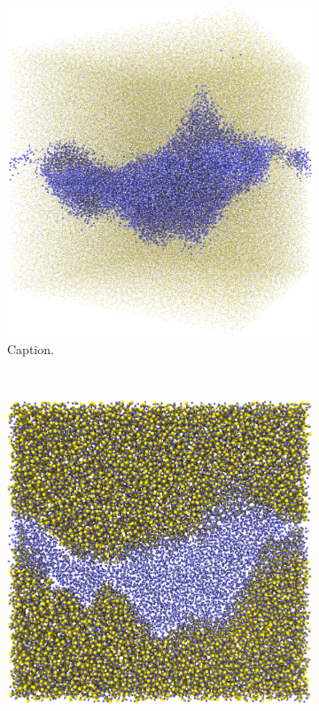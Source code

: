 \begin{figure}[htpb]
\begin{subfigure}[b]{\myfigwidth}
        \includegraphics[width=\textwidth]{images/systems/trimmed-rough_fracture01_abel_15}%
        \caption{Caption.}%
    \end{subfigure}%
    \\%
    \begin{subfigure}[b]{\myfigwidth}%
        \centering%
        \includegraphics[width=\textwidth]{images/systems/trimmed-rough_fracture01_abel_16}%

\end{subfigure}
\end{figure}
